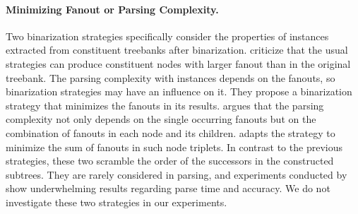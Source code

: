 \documentclass[../../document.tex]{subfiles}
\begin{document}
    \paragraph{Minimizing Fanout or Parsing Complexity.}
    Two binarization strategies specifically consider the properties of  instances extracted from constituent treebanks after binarization.
     criticize that the usual strategies can produce constituent nodes with larger fanout than in the original treebank.
    The parsing complexity with  instances depends on the fanouts, so binarization strategies may have an influence on it.
    They propose a binarization strategy that minimizes the fanouts in its results.
     argues that the parsing complexity not only depends on the single occurring fanouts but on the combination of fanouts in each node and its children.
     adapts the strategy to minimize the sum of fanouts in such node triplets.
    In contrast to the previous strategies, these two scramble the order of the successors in the constructed subtrees.
    They are rarely considered in parsing, and experiments conducted by \citet{Cra12} show underwhelming results regarding parse time and accuracy.
    We do not investigate these two strategies in our experiments.
\end{document}

